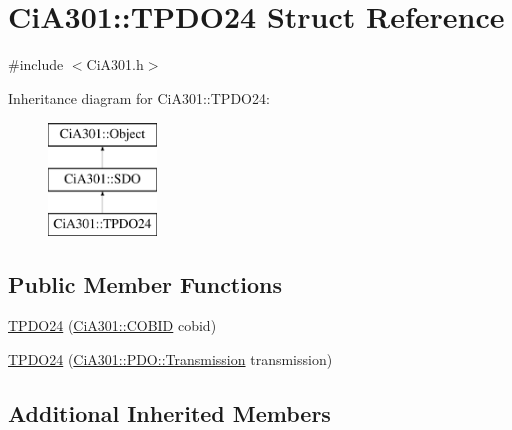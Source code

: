 \hypertarget{struct_ci_a301_1_1_t_p_d_o24}{\section{Ci\-A301\-:\-:T\-P\-D\-O24 Struct Reference}
\label{struct_ci_a301_1_1_t_p_d_o24}
}


{\ttfamily \#include $<$Ci\-A301.\-h$>$}

Inheritance diagram for Ci\-A301\-:\-:T\-P\-D\-O24\-:\begin{figure}[H]
\begin{center}
\leavevmode
\includegraphics[height=3.000000cm]{df/dd0/struct_ci_a301_1_1_t_p_d_o24}
\end{center}
\end{figure}
\subsection*{Public Member Functions}
\begin{DoxyCompactItemize}
\item 
\hyperlink{struct_ci_a301_1_1_t_p_d_o24_aa2eee63464170c0e84ab8f017add8546}{T\-P\-D\-O24} (\hyperlink{namespace_ci_a301_aec5b5dbb2b60d2837c60499f6f297aa7}{Ci\-A301\-::\-C\-O\-B\-I\-D} cobid)
\item 
\hyperlink{struct_ci_a301_1_1_t_p_d_o24_a318b297c57c9ce8ab70ab000da613dc4}{T\-P\-D\-O24} (\hyperlink{namespace_ci_a301_1_1_p_d_o_a6c7a5941fe4f869dd1703fb7ce7f6549}{Ci\-A301\-::\-P\-D\-O\-::\-Transmission} transmission)
\end{DoxyCompactItemize}
\subsection*{Additional Inherited Members}


